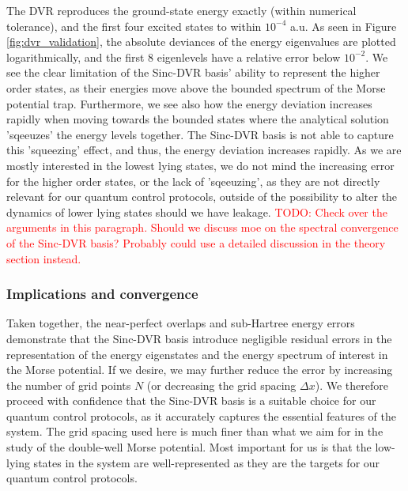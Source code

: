 \documentclass{subfiles}
\begin{document}
The DVR reproduces the ground-state energy exactly (within numerical tolerance), and the first four excited states to within $10^{-4}$ a.u. As seen in Figure \ref{fig:dvr_validation}, the absolute deviances of the energy eigenvalues are plotted logarithmically, and the first 8 eigenlevels have a relative error below $10^{-2}$. We see the clear limitation of the Sinc-DVR basis' ability to represent the higher order states, as their energies move above the bounded spectrum of the Morse potential trap. Furthermore, we see also how the energy deviation increases rapidly when moving towards the bounded states where the analytical solution 'sqeeuzes' the energy levels together. The Sinc-DVR basis is not able to capture this 'squeezing' effect, and thus, the energy deviation increases rapidly. 
As we are mostly interested in the lowest lying states, we do not mind the increasing error for the higher order states, or the lack of 'sqeeuzing', as they are not directly relevant for our quantum control protocols, outside of the possibility to alter the dynamics of lower lying states should we have leakage.  \textcolor{red}{TODO: Check over the arguments in this paragraph. Should we discuss moe on the spectral convergence of the Sinc-DVR basis? Probably could use a detailed discussion in the theory section instead.}
\subsubsection{Implications and convergence}
Taken together, the near-perfect overlaps and sub-Hartree energy errors demonstrate that the Sinc-DVR basis introduce negligible residual errors in the representation of the energy eigenstates and the energy spectrum of interest in the Morse potential. If we desire, we may further reduce the error by increasing the number of grid points $N$ (or decreasing the grid spacing $\Delta x$). We therefore proceed with confidence that the Sinc-DVR basis is a suitable choice for our quantum control protocols, as it accurately captures the essential features of the system. The grid spacing used here is much finer than what we aim for in the study of the double-well Morse potential. Most important for us is that the low-lying states in the system are well-represented as they are the targets for our quantum control protocols. 
\end{document}
